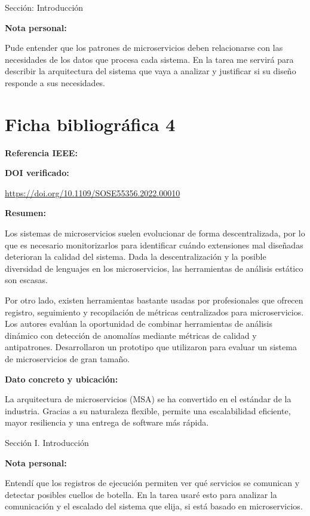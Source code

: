 \documentclass[12pt]{article}
\begin{document}
Sección: Introducción

\textbf{Nota personal:}

Pude entender que los patrones de microservicios deben relacionarse con las necesidades de los datos que procesa cada sistema. En la tarea me servirá para describir la arquitectura del sistema que vaya a analizar y justificar si su diseño responde a sus necesidades.

\clearpage
\section*{Ficha bibliográfica 4}

\textbf{Referencia IEEE:}


\textbf{DOI verificado:}

\url{https://doi.org/10.1109/SOSE55356.2022.00010}

\textbf{Resumen:}

Los sistemas de microservicios suelen evolucionar de forma descentralizada, por lo que es necesario monitorizarlos para identificar cuándo extensiones mal diseñadas deterioran la calidad del sistema. Dada la descentralización y la posible diversidad de lenguajes en los microservicios, las herramientas de análisis estático son escasas. 

Por otro lado, existen herramientas bastante usadas por profesionales que ofrecen registro, seguimiento y recopilación de métricas centralizados para microservicios. Los autores evalúan la oportunidad de combinar herramientas de análisis dinámico con detección de anomalías mediante métricas de calidad y antipatrones. Desarrollaron un prototipo que utilizaron para evaluar un sistema de microservicios de gran tamaño.

\textbf{Dato concreto y ubicación:}

La arquitectura de microservicios (MSA) se ha convertido en el estándar de la industria. Gracias a su naturaleza flexible, permite una escalabilidad eficiente, mayor resiliencia y una entrega de software más rápida.

Sección I. Introducción

\textbf{Nota personal:}

Entendí que los registros de ejecución permiten ver qué servicios se comunican y detectar posibles cuellos de botella. En la tarea usaré esto para analizar la comunicación y el escalado del sistema que elija, si está basado en microservicios.
\end{document}
